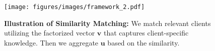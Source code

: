 \begin{figure}[t]
\small
    \centering
    \texttt{[image: figures/images/framework\_2.pdf]} 
    \vspace{-0.3in}
    \caption{\small{\textbf{Illustration of Similarity Matching:}} We match relevant clients utilizing the factorized vector $\textbf{v}$ that captures client-specific knowledge. Then we aggregate $\textbf{u}$ based on the similarity. }
    \label{fig:framework}
    \vspace{-0.2in}
\end{figure}
